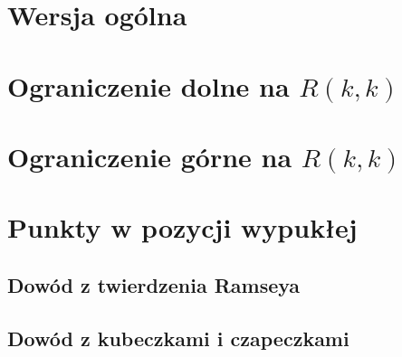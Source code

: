 \section{Wersja ogólna}


\section{Ograniczenie dolne na \texorpdfstring{\(R(k, k)\)}{R(k, k)}}


\section{Ograniczenie górne na \texorpdfstring{\(R(k, k)\)}{R(k, k)}}


\section{Punkty w pozycji wypukłej}
\subsection{Dowód z twierdzenia Ramseya}


\subsection{Dowód z kubeczkami i czapeczkami}

